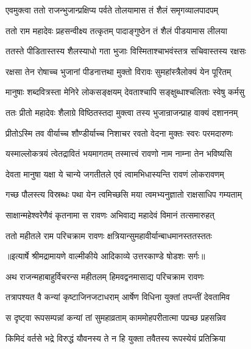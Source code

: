 \twolineshloka
{एवमुक्त्वा ततो राजन्भुजान्प्रक्षिप्य पर्वते}
{तोलयामास तं शैलं समृगव्यालपादपम्} %

\twolineshloka
{ततो राम महादेवः प्रहसन्वीक्ष्य तत्कृतम्}
{पादाङ्गुष्ठेन तं शैलं पीडयामास लीलया} %

\twolineshloka
{ततस्ते पीडितास्तस्य शैलस्याधो गता भुजाः}
{विस्मिताश्चाभवंस्तत्र सचिवास्तस्य रक्षसः} %

\twolineshloka
{रक्षसा तेन रोषाच्च भुजानां पीडनात्तथा}
{मुक्तो विरावः सुमहांस्त्रैलोक्यं येन पूरितम्} %

\twolineshloka
{मानुषाः शब्दवित्रस्ता मेनिरे लोकसङ्क्षयम्}
{देवताश्चापि सङ्क्षुब्धाश्चलिताः स्वेषु कर्मसु} %

\twolineshloka
{ततः प्रीतो महादेवः शैलाग्रे विष्ठितस्तदा}
{मुक्त्वा तस्य भुजान्राजन्प्राह वाक्यं दशाननम्} %

\twolineshloka
{प्रीतोऽस्मि तव वीर्याच्च शौण्डीर्याच्च निशाचर}
{रवतो वेदना मुक्तः स्वरः परमदारुणः} %

\twolineshloka
{यस्माल्लोकत्रयं त्वेतद्रावितं भयमागतम्}
{तस्मात्त्वं रावणो नाम नाम्ना तेन भविष्यसि} %

\twolineshloka
{देवता मानुषा यक्षा ये चान्ये जगतीतले}
{एवं त्वामभिधास्यन्ति रावणं लोकरावणम्} %

\twolineshloka
{गच्छ पौलस्त्य विस्रब्धः पथा येन त्वमिच्छसि}
{मया त्वमभ्यनुज्ञातो राक्षसाधिप गम्यताम्} %

\twolineshloka
{साक्षान्महेश्वरेणैवं कृतनामा स रावणः}
{अभिवाद्य महादेवं विमानं तत्समारुहत्} %

\twolineshloka
{ततो महीतले राम परिचक्राम रावणः}
{क्षत्रियान्सुमहावीर्यान्बाधमानस्ततस्ततः} %


{॥इत्यार्षे श्रीमद्रामायणे वाल्मीकीये आदिकाव्ये उत्तरकाण्डे षोडशः सर्गः॥}


\twolineshloka
{अथ राजन्महाबाहुर्विचरन्स महीतलम्}
{हिमवद्वनमासाद्य परिचक्राम रावणः} %

\twolineshloka
{तत्रापश्यत वै कन्यां कृष्टाजिनजटाधराम्}
{आर्षेण विधिना युक्तां तपन्तीं देवतामिव} %

\twolineshloka
{स दृष्ट्वा रूपसम्पन्नां कन्यां तां सुमहाव्रताम्}
{काममोहपरीतात्मा पप्रच्छ प्रहसन्निव} %

\twolineshloka
{किमिदं वर्तसे भद्रे विरुद्धं यौवनस्य ते}
{न हि युक्ता तवैतस्य रूपस्येयं प्रतिक्रिया} %

